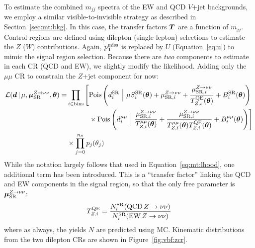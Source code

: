 To estimate the combined $m_{jj}$ spectra of the EW and QCD $V$+jet backgrounds, we employ a similar visible-to-invisible strategy as described in Section~\ref{sec:mt:bkg}.
In this case, the transfer factors $\bm{T}^{}_{}$ are a function of $m_{jj}$.
Control regions are defined using dilepton (single-lepton) selections to estimate the $Z$ ($W$) contributions.
Again, $p_\mathrm{T}^\mathrm{miss}$ is replaced by $U$ (Equation~\ref{eq:u}) to mimic the signal region selection. 
Because there are \emph{two} components to estimate in each CR (QCD and EW), we slightly modify the likelihood.
Adding only the $\mu\mu$ CR to constrain the $Z$+jet component for now:
\begin{align}
    \mathcal{L}(\bm{d} \,|\, \mu,\muz,\bm{\theta}) = & \prod_{i\in\mathrm{bins}} \left[
    \pois\left(d^{\mathrm{SR}}_{i} ~\Big|~ \mu S^{\mathrm{SR}}_{i}(\bm\theta)  + \muzi + \frac{\muzi}{\Ti{\mathrm{QE}}{Z}(\bm\theta)} + B^{\mathrm{SR}}_{i}(\bm\theta)\right) \right. \nonumber \\
    & \left. \phantom{\prod_{i\in\mathrm{bins}}\Big[} \times \pois\left(d^{\mu\mu}_i~\Big|~ \frac{\muzi}{\Ti{\mu\mu}{Z}(\bm\theta)} + \frac{\muzi}{\Ti{\mu\mu}{Z}(\bm\theta) \Ti{\mathrm{QE}}{Z}(\bm\theta)} + B^{\mu\mu}_i(\bm\theta) \right)\right]  \nonumber \\ 
    & \times  \prod_{j=0}^{n_\theta} p_j(\theta_j)
\end{align}
While the notation largely follows that used in Equation~\ref{eq:mt:lhood}, one additional term has been introduced.
This is a ``transfer factor'' linking the QCD and EW components in the signal region, so that the only free parameter is $\bm{\mu}_{\mathrm{SR}}^{Z\rightarrow\nu\nu}$:
\begin{equation}
    {T}^{\mathrm{QE}}_{Z,i} = \frac{N^\mathrm{SR}_i(\mathrm{QCD\,}Z\rightarrow\nu\nu)}{N^\mathrm{SR}_i(\mathrm{EW\,}Z\rightarrow\nu\nu)} 
\end{equation}
where as always, the yields $N$ are predicted using MC. 
Kinematic distributions from the two dilepton CRs are shown in Figure~\ref{fig:vbf:zcr}.

